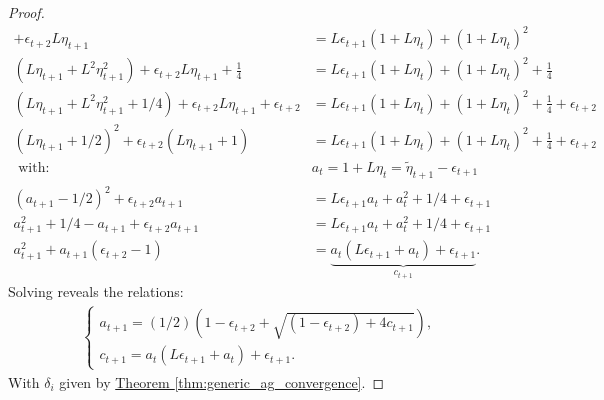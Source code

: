 \documentclass[12pt]{article}
\begin{document}
\begin{proof}
\begin{align*}
            + 
            \epsilon_{t + 2} L \eta_{t + 1} 
            &= 
            L\epsilon_{t + 1}(1 + L \eta_t)  + (1 + L\eta_t)^2
            \\
            (L\eta_{t + 1} + L^2\eta_{t + 1}^2)
            + 
            \epsilon_{t + 2} L \eta_{t + 1} 
            + 
            \frac{1}{4}
            &= 
            L\epsilon_{t + 1}(1 + L \eta_t)  + (1 + L\eta_t)^2
            + 
            \frac{1}{4}
            \\
            (L\eta_{t + 1} + L^2\eta_{t + 1}^2 + 1/4)
            + 
            \epsilon_{t + 2} L \eta_{t + 1} 
            + \epsilon_{t + 2}
            &= 
            L\epsilon_{t + 1}(1 + L \eta_t)  + (1 + L\eta_t)^2
            + \frac{1}{4}
            + \epsilon_{t + 2}
            \\
            (L\eta_{t + 1} + 1/2)^2 + \epsilon_{t + 2}(L \eta_{t + 1} + 1)
            &= 
            L \epsilon_{t + 1}(1 + L \eta_t) + (1 + L\eta_t)^2
            + \frac{1}{4} + \epsilon_{t + 2}
            \\
            \text{ with: } & a_t = 1 + L \eta_t = \tilde \eta_{t + 1} - \epsilon_{t + 1}
            \\
            (a_{t + 1} - 1/2)^2 + \epsilon_{t + 2}a_{t + 1}
            &= 
            L \epsilon_{t + 1}a_t + a_t^2 + 1/4 + \epsilon_{t + 1}
            \\
            a_{t + 1}^2 + 1/4 - a_{t + 1} + \epsilon_{t + 2}a_{t + 1}
            &= 
            L \epsilon_{t + 1}a_t + a_t^2 + 1/4 + \epsilon_{t + 1}
            \\
            a_{t + 1}^2 + a_{t + 1}(\epsilon_{t + 2} - 1)
            &= 
            \underbrace{
                a_t(L \epsilon_{t + 1} + a_t) + \epsilon_{t + 1}
            }_{c_{t + 1}}. 
        \end{align*}
        Solving reveals the relations: 
        \begin{align*}
            \begin{cases}
                a_{t + 1} = (1/2)\left(
                1 - \epsilon_{t + 2} + \sqrt{(1 - \epsilon_{t + 2}) + 4 c_{t + 1}}
                \right), 
                \\
                c_{t + 1} = a_t (L \epsilon_{t + 1} + a_t) + \epsilon_{t + 1}. 
            \end{cases}
        \end{align*}
        With $\delta_i$ given by
        \hyperref[thm:generic_ag_convergence]
        {Theorem \ref*{thm:generic_ag_convergence}}. 

\end{proof}
\end{document}

